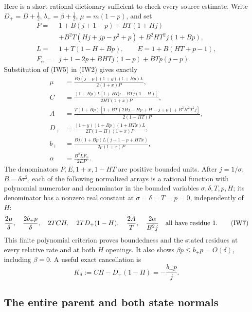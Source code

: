 Here is a short rational dictionary sufficient to check every source
estimate. Write $D_+=D+\tfrac12$, $b_+=\beta+\tfrac12$,
$\mu=m(1-p)$, and set
\[
\begin{split}
 P={}&1+B(j+1-p)+BT(1+Hj)\\
 &+B^2T(Hj+jp-p^2+p)+B^2HT^2j(1+Bp),\\
 L={}&1+T(1-H+Bp),\qquad E=1+B(HT+p-1),\\
 F_\alpha={}&j+1-2p+BHTj(1-p)+BTp(j-p).
\end{split}
\]
Substitution of (IW5) in (IW2) gives exactly
\[
\begin{split}
 \mu&=\frac{Bj(j-p)(1+y)(1+Bp)L}{2(1+x)P},\\
 C&=\frac{(1+Bp)L[1+BTp-BTj(1-H)]}{2HT(1+x)P},\\
 A&=\frac{T(1+Bp)[1+BT(2Hj-Hp+H-j+p)+B^2H^2T^2j]}
              {2(1-HT)P},\\
 D_+&=\frac{(1+y)(1+Bp)(1+HTx)L}{2T(1-H)(1+x)P},\\
 b_+&=\frac{Bj(1+Bp)L(j+1-p+HTx)}{2p(1+x)P},\\
 \alpha&=\frac{B^2LF_\alpha}{2EP}.
\end{split}                                                     \tag{IW6}
\]
The denominators $P,E,1+x,1-HT$ are positive bounded units.
After $j=1/\sigma$, $B=\delta\sigma^2$, each of the following
normalized arrays is a rational function with polynomial numerator
and denominator in the bounded variables $\sigma,\delta,T,p,H$;
its denominator has a nonzero real constant at
$\sigma=\delta=T=p=0$, independently of $H$:
\[
 \frac{2\mu}{\delta},\quad\frac{2b_+p}{\delta},\quad
 2TCH,\quad2TD_+(1-H),\quad\frac{2A}{T},\quad
 \frac{2\alpha}{B^2j}\quad\hbox{all have residue }1.
                                                               \tag{IW7}
\]
This finite polynomial criterion proves boundedness and the stated
residues at every relative rate and at both $H$ openings. It also
shows $\beta p\leq b_+p=O(\delta)$, including $\beta=0$.
A useful exact cancellation is
\[
                  K_d:=CH-D_+(1-H)=-\frac{b_+p}{j}.    \tag{IW8}
\]

\subsection{The entire parent and both state normals}

